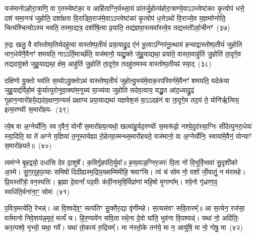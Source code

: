 यज॑मानो\-ऽहोरा॒त्राणि॒ वा ए॒तस्येष्ट॑का॒ य आहि॑ताग्नि॒र्यथ्सा॒यं प्रा॑तर्जु॒होत्य॑होरा॒त्राण्ये॒वा\-ऽऽ\-प्त्वेष्ट॑काः कृ॒त्वोप॑ धत्ते॒ दश॑ समा॒नत्र॑ जुहोति॒ दशा᳚क्षरा वि॒राड्वि॒राज॑मे॒वा\-ऽऽ\-प्त्वेष्ट॑कां कृ॒त्वोप॑ ध॒त्ते\-ऽथो॑ वि॒राज्ये॒व य॒ज्ञमा᳚प्नोति॒ चित्य॑श्चित्यो\-ऽस्य भवति॒ तस्मा॒द्यत्र॒ दशो॑षि॒त्वा प्र॒याति॒ तद्य॑ज्ञवा॒स्त्ववा᳚स्त्वे॒व तद्यत्ततो᳚\-ऽर्वा॒चीनꣳ॑~(३७)\ip

रु॒द्रः खलु॒ वै वा᳚स्तोष्प॒तिर्यदहु॑त्वा वास्तोष्प॒तीयं॑ प्रया॒याद्रु॒द्र ए॑नं भू॒त्वा\-ऽग्निर॑नू॒त्थाय॑ हन्याद्वास्तोष्प॒तीयं॑ जुहोति भाग॒\-धेये॑नै॒वैनꣳ॑ शमयति॒ नाऽऽर्ति॒मार्च्छ॑ति॒ यज॑मानो॒ यद्यु॒क्ते जु॑हु॒याद्यथा॒ प्रया॑ते॒ वास्ता॒वाहु॑तिं जु॒होति॑ ता॒दृगे॒व तद्यदयु॑क्ते जुहु॒याद्यथा॒ क्षेम॒ आहु॑तिं जु॒होति॑ ता॒दृगे॒व तदहु॑तमस्य वास्तोष्प॒तीयꣴ॑ स्या॒द्~(३८)\ip

दक्षि॑णो यु॒क्तो भव॑ति स॒व्यो\-ऽयु॒क्तो\-ऽथ॑ वास्तोष्प॒तीयं॑ जुहोत्यु॒भय॑मे॒वाक॒रप॑रिवर्गमे॒वैनꣳ॑ शमयति॒ यदेक॑या जुहु॒याद्द॑र्विहो॒मं कु॑र्यात्पुरोनुवा॒क्या॑म॒नूच्य॑ या॒ज्य॑या जुहोति सदेव॒त्वाय॒ यद्धु॒त आ॑द॒ध्याद्रु॒द्रं गृ॒हान॒न्वारो॑हये॒द्यद॑व॒\-क्षाणा॒न्यसं॑ प्रक्षाप्य प्रया॒याद्यथा॑ यज्ञवेश॒सं वा॒\-ऽऽ\-दह॑नं वा ता॒दृगे॒व तद॒यं ते॒ योनि॑र्\mbox{}ऋ॒त्विय॒ इत्य॒रण्योः᳚ स॒मारो॑हय-~(३९)\ip

त्ये॒ष वा अ॒ग्नेर्योनिः॒ स्व ए॒वैनं॒ योनौ॑ स॒मारो॑हय॒त्यथो॒ खल्वा॑हु॒र्यद॒रण्योः᳚ स॒मारू॑ढो॒ नश्ये॒दुद॑स्या॒ग्निः सी॑देत्पुनरा॒धेयः॑ स्या॒दिति॒ या ते॑ अग्ने य॒ज्ञिया॑ त॒नूस्तयेह्या रो॒हेत्या॒त्मन्थ्स॒मारो॑हयते॒ यज॑मानो॒ वा अ॒ग्नेर्योनिः॒ स्वाया॑मे॒वैनं॒ योन्याꣳ॑ स॒मारो॑हयते॥~(४०)\ip

{}%

त्वम॑ग्ने बृ॒हद्वयो॒ दधा॑सि देव दा॒शुषे᳚। क॒विर्गृ॒हप॑ति॒र्युवा᳚॥ ह॒व्य॒वाड॒ग्निर॒जरः॑ पि॒ता नो॑ वि॒भुर्वि॒भावा॑ सु॒दृशी॑को अ॒स्मे। सु॒गा॒र्॒\mbox{}ह॒प॒त्याः समिषो॑ दिदीह्यस्म॒द्रिय॒ख्सम्मि॑मीहि॒ श्रवाꣳ॑सि। त्वं च॑ सोम नो॒ वशो॑ जी॒वातुं॒ न म॑रामहे। प्रि॒यस्तो᳚त्रो॒ वन॒स्पतिः॑। ब्र॒ह्मा दे॒वानां᳚ पद॒वीः क॑वी॒नामृषि॒र्विप्रा॑णां महि॒षो मृ॒गाणा᳚म्। श्ये॒नो गृ॑ध्राणा॒ꣴ॒ स्वधि॑ति॒र्वना॑ना॒ꣳ॒ सोमः॑~(४१)\ip

प॒वित्र॒मत्ये॑ति॒ रेभन्न्॑। आ वि॒श्वदे॑व॒ꣳ॒ सत्प॑तिꣳ सू॒क्तैर॒द्या वृ॑णीमहे। स॒त्यस॑वꣳ सवि॒तारम्᳚॥ आ स॒त्येन॒ रज॑सा॒ वर्त॑मानो निवे॒शय॑न्न॒मृतं॒ मर्त्यं॑ च। हि॒र॒ण्यये॑न सवि॒ता रथे॒ना दे॒वो या॑ति॒ भुव॑ना वि॒पश्यन्न्॑। यथा॑ नो॒ अदि॑तिः॒ कर॒त्पश्वे॒ नृभ्यो॒ यथा॒ गवे᳚। यथा॑ तो॒काय॑ रु॒द्रियम्᳚। मा न॑स्तो॒के तन॑ये॒ मा न॒ आयु॑षि॒ मा नो॒ गोषु॒ मा~(४२)\ip

